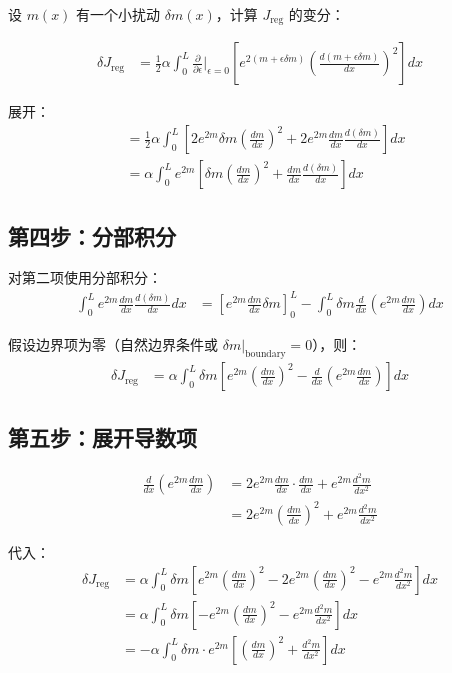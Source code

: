 \documentclass{article}
\begin{document}
设 $m(x)$ 有一个小扰动 $\delta m(x)$，计算 $J_{\text{reg}}$ 的变分：

\begin{align}
\delta J_{\text{reg}} &= \frac{1}{2} \alpha \int_0^L \frac{\partial}{\partial \epsilon}\bigg|_{\epsilon=0} \left[ e^{2(m+\epsilon \delta m)} \left( \frac{d(m+\epsilon \delta m)}{dx} \right)^2 \right] dx
\end{align}

展开：
\begin{align}
&= \frac{1}{2} \alpha \int_0^L \left[ 2e^{2m} \delta m \left(\frac{dm}{dx}\right)^2 + 2e^{2m} \frac{dm}{dx} \frac{d(\delta m)}{dx} \right] dx \\
&= \alpha \int_0^L e^{2m} \left[ \delta m \left(\frac{dm}{dx}\right)^2 + \frac{dm}{dx} \frac{d(\delta m)}{dx} \right] dx
\end{align}

\subsection*{第四步：分部积分}

对第二项使用分部积分：
\begin{align}
\int_0^L e^{2m} \frac{dm}{dx} \frac{d(\delta m)}{dx} dx &= \left[ e^{2m} \frac{dm}{dx} \delta m \right]_0^L - \int_0^L \delta m \frac{d}{dx}\left( e^{2m} \frac{dm}{dx} \right) dx
\end{align}

假设边界项为零（自然边界条件或 $\delta m|_{\text{boundary}} = 0$），则：
\begin{align}
\delta J_{\text{reg}} &= \alpha \int_0^L \delta m \left[ e^{2m} \left(\frac{dm}{dx}\right)^2 - \frac{d}{dx}\left( e^{2m} \frac{dm}{dx} \right) \right] dx
\end{align}

\subsection*{第五步：展开导数项}

\begin{align}
\frac{d}{dx}\left( e^{2m} \frac{dm}{dx} \right) &= 2e^{2m} \frac{dm}{dx} \cdot \frac{dm}{dx} + e^{2m} \frac{d^2m}{dx^2} \\
&= 2e^{2m} \left(\frac{dm}{dx}\right)^2 + e^{2m} \frac{d^2m}{dx^2}
\end{align}

代入：
\begin{align}
\delta J_{\text{reg}} &= \alpha \int_0^L \delta m \left[ e^{2m} \left(\frac{dm}{dx}\right)^2 - 2e^{2m} \left(\frac{dm}{dx}\right)^2 - e^{2m} \frac{d^2m}{dx^2} \right] dx \\
&= \alpha \int_0^L \delta m \left[ -e^{2m} \left(\frac{dm}{dx}\right)^2 - e^{2m} \frac{d^2m}{dx^2} \right] dx \\
&= -\alpha \int_0^L \delta m \cdot e^{2m} \left[ \left(\frac{dm}{dx}\right)^2 + \frac{d^2m}{dx^2} \right] dx
\end{align}
\end{document}
